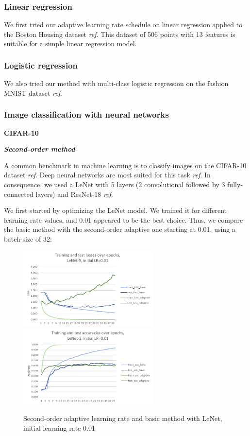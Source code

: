 \documentclass{article}
\begin{document}
  \subsubsection{Linear regression}
  
  We first tried our adaptive learning rate schedule on linear regression applied to the Boston Housing dataset \emph{ref}. This dataset of 506 points with 13 features is suitable for a simple linear regression model. 
  
  \subsubsection{Logistic regression}
  
  We also tried our method with multi-class logistic regression on the fashion MNIST dataset \emph{ref}. 
  
  \subsubsection{Image classification with neural networks}
  
  \textbf{CIFAR-10}
  
  \emph{\textbf{Second-order method}}
  
  A common benchmark in machine learning is to classify images on the CIFAR-10 dataset \emph{ref}. Deep neural networks are most suited for this task \emph{ref}. In consequence, we used a LeNet with 5 layers (2 convolutional followed by 3 fully-connected layers) and ResNet-18 \emph{ref}.
  
  We first started by optimizing the LeNet model. We trained it for different learning rate values, and 0.01 appeared to be the best choice. Thus, we compare the basic method with the second-order adaptive one starting at 0.01, using a batch-size of 32:\\
  
  \begin{figure}[!h]
  	\includegraphics[width=200pt]{loss_lenet_0_01.png}
  	\includegraphics[width=200pt]{acc_lenet_0_01.png}
  	\caption{Second-order adaptive learning rate and basic method with LeNet, initial learning rate 0.01}
  \end{figure}
\end{document}
